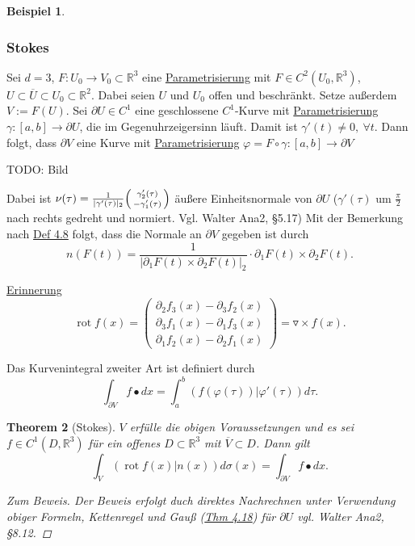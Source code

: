 \documentclass[a4paper]{scrreprt}
\newcommand{\R}{\mathbb{R}}
\newenvironment{jsmallmatrix}{\left( \begin{smallmatrix}}{\end{smallmatrix} \right)}
\newcommand{\jlabel}[1]{\label{j_#1}}
\newcommand{\jhyperref}[2]{\hyperref[j_#1]{#2}}
\newcommand{\jlink}[1]{\jhyperref{#1}{#1}}
\newcommand{\jabb}[3]{ #1: #2 \rightarrow #3 }
\newcommand{\jspace}{\vspace{8pt}}
\newcommand{\rot}{\mathop{\mathrm{{rot}}}}
\theoremstyle{plain}
\newtheorem{thm}{Theorem}[chapter]
\theoremstyle{definition}
\newtheorem{expl}[thm]{Beispiel}
\begin{document}
{{{{\begin{expl}
\end{expl}

\subsubsection{Stokes}

Sei $d=3$, $\jabb{F}{U_0}{V_0} \subset \R^3$ eine \jlink{Parametrisierung} mit $F\in C^2(U_0,\R^3)$, $U\subset \overline{U} \subset U_0 \subset \R^2$. Dabei seien $U$ und $U_0$ offen und beschränkt. Setze außerdem $V:= F(U)$. Sei $\partial U\in C^1$ eine geschlossene $C^1$-Kurve mit \jlink{Parametrisierung} $\jabb{\gamma}{[a,b]}{\partial U}$, die im Gegenuhrzeigersinn läuft. Damit ist $\gamma'(t) \ne 0,\ \forall t$. Dann folgt, dass $\partial V$ eine Kurve mit \jlink{Parametrisierung} $\varphi = \jabb{F \circ \gamma}{[a,b]}{\partial V}$

\jspace

TODO: Bild

\jspace

Dabei ist $\nu(\tau) = \frac{1}{|\gamma'(\tau)|_2}\begin{jsmallmatrix}
                                                      \gamma_2'(\tau)\\ -\gamma_1'(\tau)
                                                  \end{jsmallmatrix}$ äußere Einheitsnormale von $\partial U$ ($\gamma'(\tau)$ um $\frac{\pi}{2}$ nach rechts gedreht und normiert. Vgl. Walter Ana2, §5.17)
Mit der Bemerkung nach \jlink{Def 4.8} folgt, dass die Normale an $\partial V$ gegeben ist durch
\begin{equation}
    \jlabel{(4.11)}
    n(F(t)) = \frac{1}{|\partial_1 F(t) \times \partial_2 F(t)|_2}\cdot \partial_1 F(t) \times \partial_2 F(t).
\end{equation}

\uline{Erinnerung}
\[
    \rot f(x) = \begin{pmatrix}
                    \partial_2 f_3(x) - \partial_3 f_2(x)\\
                    \partial_3 f_1(x) - \partial_1 f_3(x)\\
                    \partial_1 f_2(x) - \partial_2 f_1(x)
                \end{pmatrix} = \triangledown \times f(x).
\]

Das Kurvenintegral zweiter Art ist definiert durch
\[
    \int_{\partial V} f \bullet dx = \int_a^b (f(\varphi(\tau))|\varphi'(\tau)) d\tau.
\]

\begin{thm}[Stokes]
    \jlabel{Thm 4.22}
    \jlabel{Stokes}
    $V$ erfülle die obigen Voraussetzungen und es sei $f \in C^1(D,\R^3)$ für ein offenes $D\subset \R^3$ mit $\overline{V} \subset D$. Dann gilt
    \[
        \int_V (\rot f(x)|n(x))d\sigma(x) = \int_{\partial V} f \bullet dx.
    \]
    \begin{proof}[Zum Beweis]
        Der Beweis erfolgt duch direktes Nachrechnen unter Verwendung obiger Formeln, Kettenregel und Gauß (\jlink{Thm 4.18}) für $\partial U$ vgl. Walter Ana2, §8.12.
    \end{proof}
\end{thm}

}}}}
\end{document}
